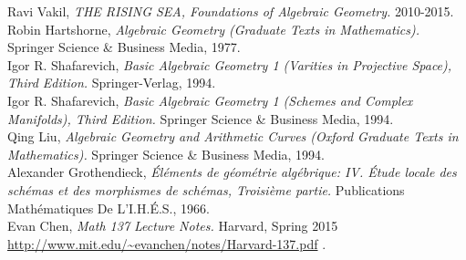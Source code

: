 \documentclass[10pt]{amsbook}%
\theoremstyle{plain}
\theoremstyle{definition}
\numberwithin{equation}{section}
\begin{document}

\def\arXiv#1{\href{http://arxiv.org/abs/#1}{arXiv:#1}}

\begin{thebibliography}{0}
 
  Ravi Vakil,
   \emph{THE RISING SEA, Foundations of Algebraic Geometry. \/}
   2010-2015. \\

  Robin Hartshorne,
   \emph{Algebraic Geometry (Graduate Texts in Mathematics). \/}
   Springer Science \& Business Media, 1977. \\

  Igor R. Shafarevich,
   \emph{Basic Algebraic Geometry 1 (Varities in Projective Space), Third Edition. \/}
   Springer-Verlag, 1994. \\

  Igor R. Shafarevich,
   \emph{Basic Algebraic Geometry 1 (Schemes and Complex Manifolds), Third Edition. \/}
   Springer Science \& Business Media, 1994. \\

  Qing Liu,
   \emph{Algebraic Geometry and Arithmetic Curves (Oxford Graduate Texts in Mathematics). \/}
   Springer Science \& Business Media, 1994. \\

  Alexander Grothendieck,
   \emph{\'El\'ements de g\'eom\'etrie alg\'ebrique: IV. \'Etude locale des sch\'emas et des morphismes de sch\'emas, Troisi\`eme partie. \/ }
   Publications Math\'ematiques De L'I.H.\'E.S., 1966. \\

  Evan Chen,
   \emph{Math 137 Lecture Notes. \/}
   Harvard, Spring 2015 \url{http://www.mit.edu/~evanchen/notes/Harvard-137.pdf} .\\



\end{thebibliography}
\end{document}
